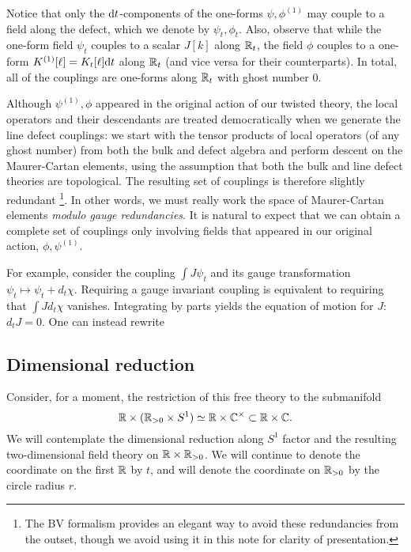 \documentclass[11pt]{amsart}
\begin{document}
Notice that only the ${\rm d} t$-components of the one-forms $\psi, \phi^{(1)}$ may couple to a field along the defect, which we denote by $\psi_t, \phi_t$. 
Also, observe that while the one-form field $\psi_t$ couples to a scalar $J[k]$ along $\mathbb R_t$, the field $\phi$ couples to a one-form $K^{(1)}[\ell] = K_t [\ell] {\rm d} t$ along $\mathbb R_t$ (and vice versa for their counterparts). In total, all of the couplings are one-forms along $\mathbb R_t$ with ghost number 0. 

Although $\psi^{(1)}, \phi$ appeared in the original action of our twisted theory, the local operators and their descendants are treated democratically when we generate the line defect couplings: we start with the tensor products of local operators (of any ghost number) from both the bulk and defect algebra and perform descent on the Maurer-Cartan elements, using the assumption that both the bulk and line defect theories are topological. The resulting set of couplings is therefore slightly redundant \footnote{The BV formalism provides an elegant way to avoid these redundancies from the outset, though we avoid using it in this note for clarity of presentation.}. In other words, we must really work the space of Maurer-Cartan elements \textit{modulo gauge redundancies}. It is natural to expect that we can obtain a complete set of couplings only involving fields that appeared in our original action, $\phi, \psi^{(1)}$.

For example, consider the coupling $\int J \psi_t$ and its gauge transformation $\psi_t \mapsto \psi_t + d_t \chi$. Requiring a gauge invariant coupling is equivalent to requiring that $\int J d_t \chi$ vanishes. Integrating by parts yields the equation of motion for $J$: $d_t J = 0$. One can instead rewrite 








\subsection*{Dimensional reduction}

Consider, for a moment, the restriction of this free theory to the submanifold 
\[
\mathbb R \times (\mathbb R_{>0} \times S^1) \simeq \mathbb R \times \mathbb C^\times \subset \mathbb R \times \mathbb C .
\]
We will contemplate the dimensional reduction along $S^1$ factor and the resulting two-dimensional field theory on $\mathbb R \times \mathbb R_{>0}$. 
We will continue to denote the coordinate on the first $\mathbb R$ by $t$, and will denote the coordinate on $\mathbb R_{>0}$ by the circle radius $r$.  
\end{document}

